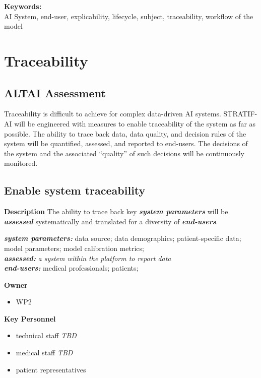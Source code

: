 \documentclass[
  letterpaper,
  DIV=11,
  numbers=noendperiod]{scrreport}
\providecommand{\tightlist}{%
  \setlength{\itemsep}{0pt}\setlength{\parskip}{0pt}}\usepackage{longtable,booktabs,array}
\begin{document}
\textbf{Keywords:}\\
AI System, end-user, explicability, lifecycle, subject, traceability,
workflow of the model

\hypertarget{traceability}{%
\section{Traceability}\label{traceability}}

\hypertarget{altai-assessment-8}{%
\subsection*{ALTAI Assessment}\label{altai-assessment-8}}

Traceability is difficult to achieve for complex data-driven AI systems.
STRATIF-AI will be engineered with measures to enable traceability of
the system as far as possible. The ability to trace back data, data
quality, and decision rules of the system will be quantified, assessed,
and reported to end-users. The decisions of the system and the
associated ``quality'' of such decisions will be continuously monitored.

\hypertarget{enable-system-traceability}{%
\subsection{Enable system
traceability}\label{enable-system-traceability}}

\textbf{Description} The ability to trace back key \textbf{\emph{system
parameters}} will be \textbf{\emph{assessed}} systematically and
translated for a diversity of \textbf{\emph{end-users}}.

\textbf{\emph{system parameters:}} data source; data demographics;
patient-specific data; model parameters; model calibration metrics;\\
\textbf{\emph{assessed:}} \emph{a system within the platform to report
data}\\
\textbf{\emph{end-users:}} medical professionals; patients;

\textbf{Owner}

\begin{itemize}
\tightlist
\item
  WP2
\end{itemize}

\textbf{Key Personnel}

\begin{itemize}
\tightlist
\item
  technical staff \emph{TBD}
\item
  medical staff \emph{TBD}
\item
  patient representatives
\end{itemize}
\end{document}
